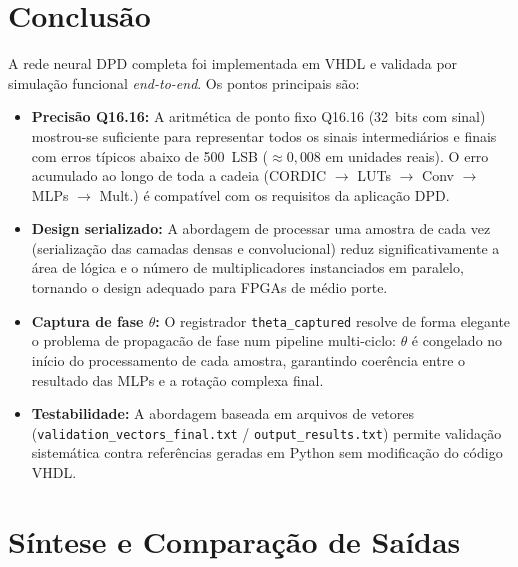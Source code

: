 \documentclass[a4paper,12pt]{article}
\begin{document}
\section{Conclus\~ao}

A rede neural DPD completa foi implementada em VHDL e validada por simula\c{c}\~ao funcional \textit{end-to-end}. Os pontos principais s\~ao:

\begin{itemize}
    \item \textbf{Precis\~ao Q16.16:} A aritm\'etica de ponto fixo Q16.16 (32~bits com sinal) mostrou-se suficiente para representar todos os sinais intermedi\'arios e finais com erros t\'ipicos abaixo de 500~LSB ($\approx 0{,}008$ em unidades reais). O erro acumulado ao longo de toda a cadeia (CORDIC $\to$ LUTs $\to$ Conv $\to$ MLPs $\to$ Mult.) \'e compat\'ivel com os requisitos da aplica\c{c}\~ao DPD.

    \item \textbf{Design serializado:} A abordagem de processar uma amostra de cada vez (serializa\c{c}\~ao das camadas densas e convolucional) reduz significativamente a \'area de l\'ogica e o n\'umero de multiplicadores instanciados em paralelo, tornando o design adequado para FPGAs de m\'edio porte.

    \item \textbf{Captura de fase $\theta$:} O registrador \texttt{theta\_captured} resolve de forma elegante o problema de propagac\~ao de fase num pipeline multi-ciclo: $\theta$ \'e congelado no in\'icio do processamento de cada amostra, garantindo coer\^encia entre o resultado das MLPs e a rota\c{c}\~ao complexa final.

    \item \textbf{Testabilidade:} A abordagem baseada em arquivos de vetores (\texttt{validation\_vectors\_final.txt} / \texttt{output\_results.txt}) permite valida\c{c}\~ao sistem\'atica contra refer\^encias geradas em Python sem modifica\c{c}\~ao do c\'odigo VHDL.
\end{itemize}

\section{S\'intese e Compara\c{c}\~ao de Sa\'idas}
\end{document}
